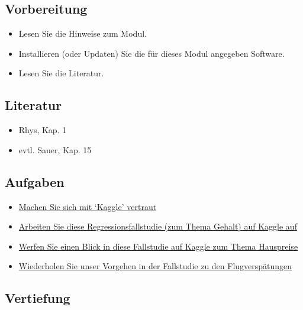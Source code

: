 \documentclass[
]{book}
\providecommand{\tightlist}{%
  \setlength{\itemsep}{0pt}\setlength{\parskip}{0pt}}
\begin{document}
\hypertarget{vorbereitung}{%
\subsection{Vorbereitung}\label{vorbereitung}}

\begin{itemize}
\tightlist
\item
  Lesen Sie die Hinweise zum Modul.
\item
  Installieren (oder Updaten) Sie die für dieses Modul angegeben Software.
\item
  Lesen Sie die Literatur.
\end{itemize}

\hypertarget{literatur-1}{%
\subsection{Literatur}\label{literatur-1}}

\begin{itemize}
\tightlist
\item
  Rhys, Kap. 1
\item
  evtl. Sauer, Kap. 15
\end{itemize}

\hypertarget{aufgaben}{%
\subsection{Aufgaben}\label{aufgaben}}

\begin{itemize}
\tightlist
\item
  \href{https://www.kaggle.com/}{Machen Sie sich mit `Kaggle' vertraut}
\item
  \href{https://www.kaggle.com/pranjalpandey12/performing-simple-linear-regression-in-r}{Arbeiten Sie diese Regressionsfallstudie (zum Thema Gehalt) auf Kaggle auf}
\item
  \href{https://www.kaggle.com/lazaro97/data-preprocessing-and-linear-regression-with-r}{Werfen Sie einen Blick in diese Fallstudie auf Kaggle zum Thema Hauspreise}
\item
  \href{https://data-se.netlify.app/2021/03/10/fallstudie-modellierung-von-flugversp\%C3\%A4tungen/}{Wiederholen Sie unser Vorgehen in der Fallstudie zu den Flugverspätungen}
\end{itemize}

\hypertarget{vertiefung}{%
\subsection{Vertiefung}\label{vertiefung}}
\end{document}
